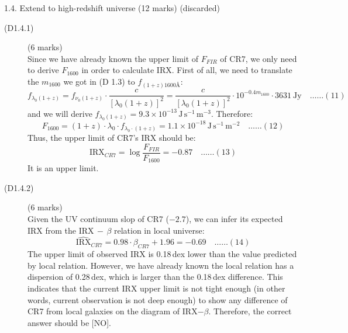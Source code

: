 1.4. Extend to high-redshift universe \hfill(12 marks) (discarded)

\begin{description}
\item[(D1.4.1)] \hfill(6 marks)\\
  Since we have already known the upper limit of $F_{FIR}$ of CR7, we only
  need to derive $F_{1600}$ in order to calculate IRX. First of all, we need
  to translate the $m_{1600}$ we got in (D 1.3) to
  $f_{(1+z)1600\text{\AA}}$:
  \[ f_{\lambda_0(1+z)} = f_{\nu_0(1+z)}\cdot
     \frac{c}{[\lambda_0(1+z)]^2}
     = \frac{c}{[\lambda_0(1+z)]^2}\cdot 10^{-0.4 m_{1600}}\cdot
     3631\ \mathrm{Jy} \quad\ldots\ldots(11) \]
  and we will derive
  $f_{\lambda_0(1+z)} = 9.3\times 10^{-13}\,
  \mathrm{J\,s^{-1}\,m^{-3}}$. Therefore:
  \[ F_{1600} = (1+z)\cdot\lambda_0\cdot f_{\lambda_0\cdot(1+z)}
     = 1.1\times 10^{-18}\,\mathrm{J\,s^{-1}\,m^{-2}}
     \quad\ldots\ldots(12) \]
  Thus, the upper limit of CR7's IRX should be:
  \[ \mathrm{IRX}_{CR7} = \log\frac{F_{FIR}}{F_{1600}} = -0.87
     \quad\ldots\ldots(13) \]
  It is an upper limit.

\item[(D1.4.2)] \hfill(6 marks)\\
  Given the UV continuum slop of CR7 ($-2.7$), we can infer its expected IRX
  from the IRX$\,-\,\beta$ relation in local universe:
  \[ \widehat{\mathrm{IRX}}_{CR7} = 0.98\cdot\beta_{CR7} + 1.96 = -0.69
     \quad\ldots\ldots(14) \]
  The upper limit of observed IRX is 0.18\,dex lower than the value predicted
  by local relation. However, we have already known the local relation has a
  dispersion of 0.28\,dex, which is larger than the 0.18\,dex difference.
  This indicates that the current IRX upper limit is not tight enough (in
  other words, current observation is not deep enough) to show any difference
  of CR7 from local galaxies on the diagram of IRX$-\beta$. Therefore, the
  correct answer should be [NO].
\end{description}

